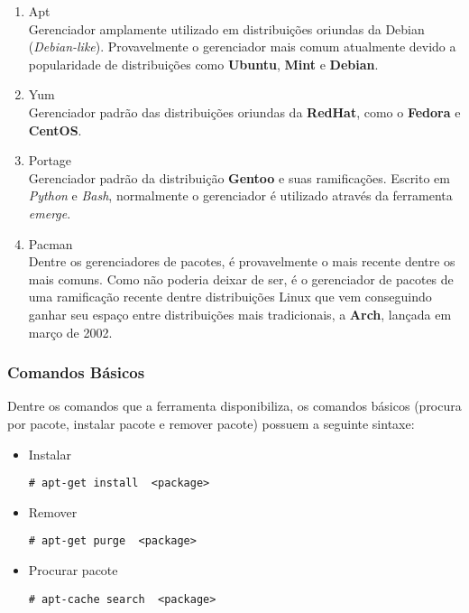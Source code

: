 \begin{enumerate}
	\item Apt\\
		Gerenciador amplamente utilizado em distribuições oriundas da Debian (\textit{Debian-like}). Provavelmente o gerenciador mais comum atualmente devido a popularidade de distribuições como \textbf{Ubuntu}, \textbf{Mint} e \textbf{Debian}.
	\item Yum\\
		Gerenciador padrão  das distribuições oriundas da \textbf{RedHat}, como o \textbf{Fedora} e \textbf{CentOS}.
	\item Portage\\
		Gerenciador padrão da distribuição \textbf{Gentoo} e suas ramificações. Escrito em \textit{Python} e \textit{Bash}, normalmente o gerenciador é utilizado através da ferramenta \textit{emerge}.
	\item Pacman\\
		Dentre os gerenciadores de pacotes, é provavelmente o mais recente dentre os mais comuns. Como não poderia deixar de ser, é  o gerenciador de pacotes de uma ramificação recente dentre distribuições Linux que vem conseguindo ganhar seu espaço entre distribuições mais tradicionais, a \textbf{Arch}, lançada em março de 2002.
\end{enumerate}

\subsubsection{Comandos Básicos} %
\label{sec:comandos_b_sicos}


\label{sub:apt}

Dentre os comandos que a ferramenta disponibiliza, os comandos básicos (procura por pacote, instalar pacote e remover pacote) possuem a seguinte sintaxe:

\begin{itemize}
	\item Instalar
	\begin{lstlisting}[numbers=none,commentstyle=\color{black}]
	# apt-get install  <package>
	\end{lstlisting}
	\item Remover
	\begin{lstlisting}[numbers=none,commentstyle=\color{black}]
	# apt-get purge  <package>
	\end{lstlisting}
	\item Procurar pacote
	\begin{lstlisting}[numbers=none,commentstyle=\color{black}]
	# apt-cache search  <package>
	\end{lstlisting}
\end{itemize}


